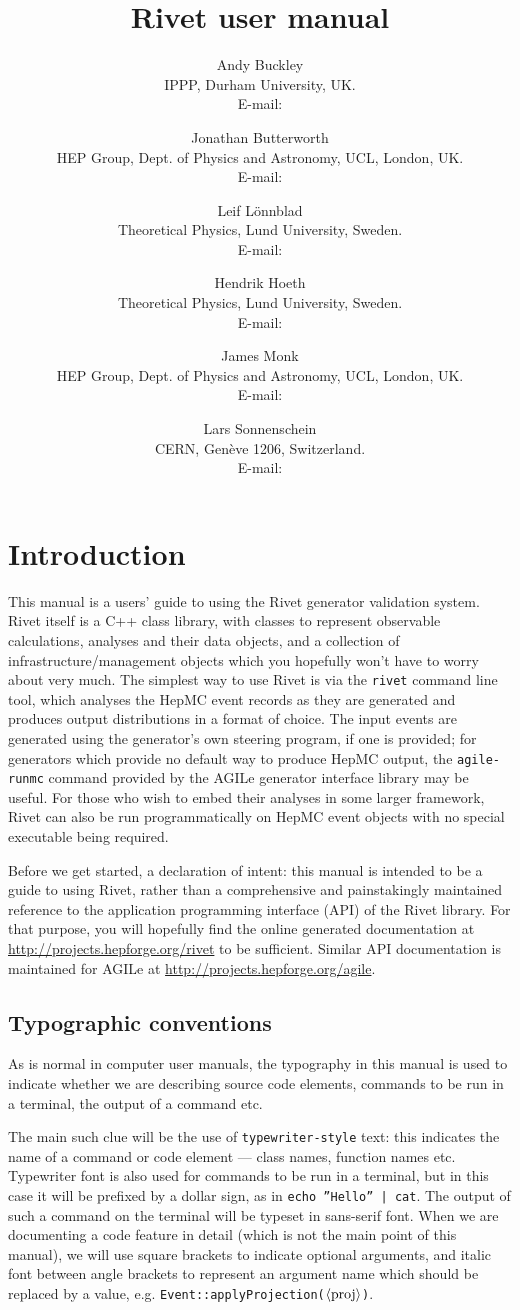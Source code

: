 \documentclass{JHEP3}
\title{Rivet user manual}
\author{Andy Buckley\\ IPPP, Durham University, UK.\\ E-mail: \email{andy.buckley@durham.ac.uk}}
\author{Jonathan Butterworth\\ HEP Group, Dept. of Physics and Astronomy, UCL, London, UK.\\ E-mail: \email{J.Butterworth@ucl.ac.uk}}
\author{Leif L\"onnblad\\ Theoretical Physics, Lund University, Sweden.\\ E-mail: \email{lonnblad@thep.lu.se}}
\author{Hendrik Hoeth\\ Theoretical Physics, Lund University, Sweden.\\ E-mail: \email{hoeth@thep.lu.se}}
\author{James Monk\\ HEP Group, Dept. of Physics and Astronomy, UCL, London, UK.\\ E-mail: \email{jmonk@hep.ucl.ac.uk}}
\author{Lars Sonnenschein\\ CERN, Gen\`eve 1206, Switzerland.\\ E-mail: \email{sonne@cern.ch}}
\newcommand{\kbd}[1]{\texttt{#1}\xspace}
\newcommand{\inp}[1]{\textsf{\textdollar}\hspace{1mm}\texttt{#1}\xspace}
\newcommand{\outp}[1]{\textsf{#1}\xspace}
\newcommand{\code}[1]{\texttt{#1}\xspace}
\newcommand{\val}[1]{\textit{\ensuremath{\langle\text{\textrm{#1}\/}\rangle}}\xspace}
\begin{document}
 


\section{Introduction}
This manual is a users' guide to using the Rivet generator validation
system. Rivet itself is a C++ class library, with classes to represent
observable calculations, analyses and their data objects, and a collection of
infrastructure/management objects which you hopefully won't have to worry about
very much. The simplest way to use Rivet is via the \kbd{rivet} command line
tool, which analyses the HepMC event records as they are generated and produces
output distributions in a format of choice. The input events are generated using
the generator's own steering program, if one is provided; for generators which
provide no default way to produce HepMC output, the \kbd{agile-runmc} command
provided by the AGILe generator interface library may be useful. For those who
wish to embed their analyses in some larger framework, Rivet can also be run
programmatically on HepMC event objects with no special executable being
required.

Before we get started, a declaration of intent: this manual is intended to be a
guide to using Rivet, rather than a comprehensive and painstakingly maintained
reference to the application programming interface (API) of the Rivet
library. For that purpose, you will hopefully find the online generated
documentation at \url{http://projects.hepforge.org/rivet} to be
sufficient. Similar API documentation is maintained for AGILe at
\url{http://projects.hepforge.org/agile}.


\subsection{Typographic conventions}
As is normal in computer user manuals, the typography in this manual is used to
indicate whether we are describing source code elements, commands to be run in a
terminal, the output of a command etc.

The main such clue will be the use of \kbd{typewriter-style} text: this
indicates the name of a command or code element --- class names, function names
etc. Typewriter font is also used for commands to be run in a terminal, but in
this case it will be prefixed by a dollar sign, as in \inp{echo ''Hello'' |
  cat}.  The output of such a command on the terminal will be typeset in
\outp{sans-serif} font. When we are documenting a code feature in detail (which
is not the main point of this manual), we will use square brackets to indicate
optional arguments, and italic font between angle brackets to represent an
argument name which should be replaced by a value,
e.g. \code{Event::applyProjection(\val{proj})}.
\end{document}
